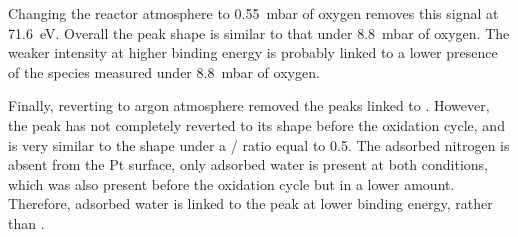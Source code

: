 Changing the reactor atmosphere to \qty{0.55}{\milli\bar} of oxygen removes this  signal at \qty{71.6}{\eV}.
Overall the peak shape is similar to that under \qty{8.8}{\milli\bar} of oxygen.
The weaker intensity at higher binding energy is probably linked to a lower presence of the species measured under \qty{8.8}{\milli\bar} of oxygen.

Finally, reverting to argon atmosphere removed the peaks linked to .
However, the peak has not completely reverted to its shape before the oxidation cycle, and is very similar to the shape under a / ratio equal to \num{0.5}.
The adsorbed nitrogen is absent from the Pt surface, only adsorbed water is present at both conditions, which was also present before the oxidation cycle but in a lower amount.
Therefore, adsorbed water is linked to the peak at lower binding energy, rather than .